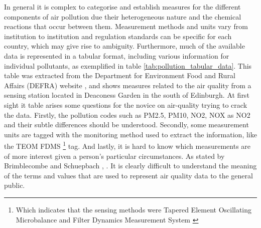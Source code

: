 In general it is complex to categorise and establish measures for the different components of air pollution due their heterogeneous nature and the chemical reactions that occur between them. Measurement methods and units vary from institution to institution and regulation standards can be specific for each country, which may give rise to ambiguity. Furthermore, much of the available data is represented in a tabular format, including various information for individual pollutants, as exemplified in table \ref{tab:pollution_tabular_data}. This table was extracted from the  Department for Environment Food and Rural Affairs (DEFRA) website \cite{DepartmentforEnvironmenta}, and shows measures related to the air quality from a sensing station located in Deaconess Garden in the south of Edinburgh. At first sight it table arises some questions for the novice on air-quality trying to crack the data. Firstly, the pollution codes such as PM2.5, PM10, NO2, NOX as NO2 and their subtle differences should be understood. Secondly, some measurement units are tagged with the monitoring method used to extract the information, like the TEOM FDMS \footnote{Which indicates that the sensing methods were Tapered Element Oscillating Microbalance and Filter Dynamics Measurement System \cite{Quality2005}} tag. And lastly, it is hard to know which measurements are of more interest given a person's particular circumstances. As stated by Brimblecombe and Schuepbach \cite{P.Brimblecombe2008}, .  It is clearly difficult to understand the meaning of the terms and values that are used to represent air quality data to the general public. 

